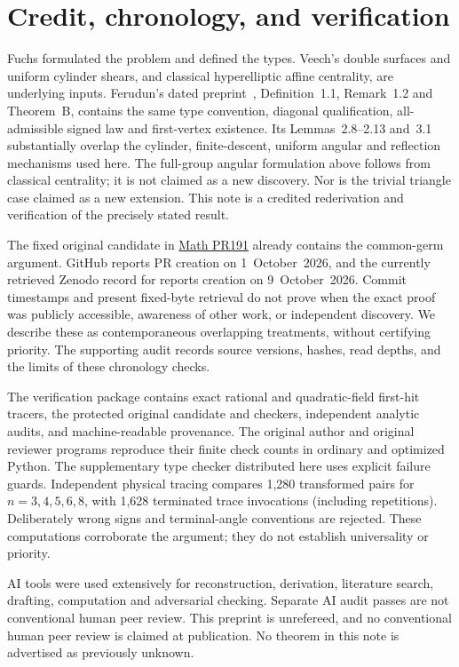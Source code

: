 \documentclass[11pt]{article}
\begin{document}
\section{Credit, chronology, and verification}
Fuchs formulated the problem and defined the types. Veech's
double surfaces and uniform cylinder shears, and classical
hyperelliptic affine centrality, are underlying inputs.
Ferudun's dated preprint~\cite{Ferudun}, Definition~1.1,
Remark~1.2 and Theorem~B, contains the same type convention,
diagonal qualification, all-admissible signed law and first-vertex
existence. Its Lemmas~2.8--2.13 and~3.1 substantially overlap the
cylinder, finite-descent, uniform angular and reflection mechanisms
used here. The full-group angular formulation above follows from
classical centrality; it is not claimed as a new discovery.
Nor is the trivial triangle case claimed as a new extension.
This note is a credited rederivation and verification of the
precisely stated result.

The fixed original candidate in
\href{https://github.com/AlecKriebel/Math/pull/191}{Math PR191}
already contains the common-germ argument.
GitHub reports PR creation on 1~October~2026, and the currently
retrieved Zenodo record for \cite{Ferudun} reports creation on
9~October~2026. Commit timestamps and present fixed-byte retrieval
do not prove when the exact proof was publicly accessible, awareness
of other work, or independent discovery. We describe these as
contemporaneous overlapping treatments, without certifying priority.
The supporting audit records source versions, hashes, read depths,
and the limits of these chronology checks.

The verification package contains exact rational and quadratic-field
first-hit tracers, the protected original candidate and checkers,
independent analytic audits, and machine-readable provenance.
The original author and original reviewer programs reproduce their
finite check counts in ordinary and optimized Python. The supplementary
type checker distributed here uses explicit failure guards.
Independent physical tracing compares 1,280 transformed pairs for
$n=3,4,5,6,8$, with 1,628 terminated trace invocations
(including repetitions). Deliberately wrong signs and terminal-angle
conventions are rejected. These computations corroborate the argument;
they do not establish universality or priority.

AI tools were used extensively for reconstruction, derivation, literature
search, drafting, computation and adversarial checking.
Separate AI audit passes are not conventional human peer review.
This preprint is unrefereed, and no conventional human peer review is
claimed at publication. No theorem in this note is advertised as
previously unknown.
\end{document}
